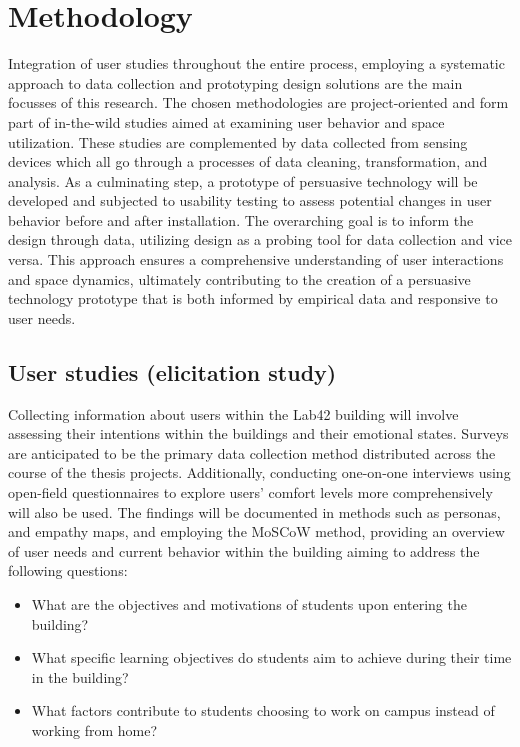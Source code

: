 \section{Methodology}

Integration of user studies throughout the entire process, employing a systematic approach to data collection and prototyping design solutions are the main focusses of this research. The chosen methodologies are project-oriented and form part of in-the-wild studies aimed at examining user behavior and space utilization. These studies are complemented by data collected from sensing devices which all go through a processes of data cleaning, transformation, and analysis. As a culminating step, a prototype of persuasive technology will be developed and subjected to usability testing to assess potential changes in user behavior before and after installation. The overarching goal is to inform the design through data, utilizing design as a probing tool for data collection and vice versa. This approach ensures a comprehensive understanding of user interactions and space dynamics, ultimately contributing to the creation of a persuasive technology prototype that is both informed by empirical data and responsive to user needs.

\subsection{User studies (elicitation study)}

Collecting information about users within the Lab42 building will involve assessing their intentions within the buildings and their emotional states. Surveys are anticipated to be the primary data collection method distributed across the course of the thesis projects. Additionally, conducting one-on-one interviews using open-field questionnaires to explore users' comfort levels more comprehensively will also be used. The findings will be documented in methods such as personas, and empathy maps, and employing the MoSCoW method, providing an overview of user needs and current behavior within the building aiming to address the following questions:

\begin{itemize}
  \item What are the objectives and motivations of students upon entering the building?
  \item What specific learning objectives do students aim to achieve during their time in the building?
  \item What factors contribute to students choosing to work on campus instead of working from home?
\end{itemize}

